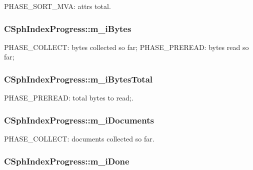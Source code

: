 P\-H\-A\-S\-E\-\_\-\-S\-O\-R\-T\-\_\-\-M\-V\-A\-: attrs total. 

\hypertarget{structCSphIndexProgress_a778f740e2ce2fa762b042bdb3ae06cbc}{
\subsubsection[{m\-\_\-i\-Bytes}]{ C\-Sph\-Index\-Progress\-::m\-\_\-i\-Bytes}}\label{structCSphIndexProgress_a778f740e2ce2fa762b042bdb3ae06cbc}
P\-H\-A\-S\-E\-\_\-\-C\-O\-L\-L\-E\-C\-T\-: bytes collected so far; P\-H\-A\-S\-E\-\_\-\-P\-R\-E\-R\-E\-A\-D\-: bytes read so far; \hypertarget{structCSphIndexProgress_a3f89e51e9c2238eec970ba7de63ba33d}{
\subsubsection[{m\-\_\-i\-Bytes\-Total}]{ C\-Sph\-Index\-Progress\-::m\-\_\-i\-Bytes\-Total}}\label{structCSphIndexProgress_a3f89e51e9c2238eec970ba7de63ba33d}


P\-H\-A\-S\-E\-\_\-\-P\-R\-E\-R\-E\-A\-D\-: total bytes to read;. 

\hypertarget{structCSphIndexProgress_aa3fdf708687fd27e13bae4f384f605f0}{
\subsubsection[{m\-\_\-i\-Documents}]{ C\-Sph\-Index\-Progress\-::m\-\_\-i\-Documents}}\label{structCSphIndexProgress_aa3fdf708687fd27e13bae4f384f605f0}


P\-H\-A\-S\-E\-\_\-\-C\-O\-L\-L\-E\-C\-T\-: documents collected so far. 

\hypertarget{structCSphIndexProgress_a0b0973438825896226077882ce070e56}{
\subsubsection[{m\-\_\-i\-Done}]{ C\-Sph\-Index\-Progress\-::m\-\_\-i\-Done}}\label{structCSphIndexProgress_a0b0973438825896226077882ce070e56}


